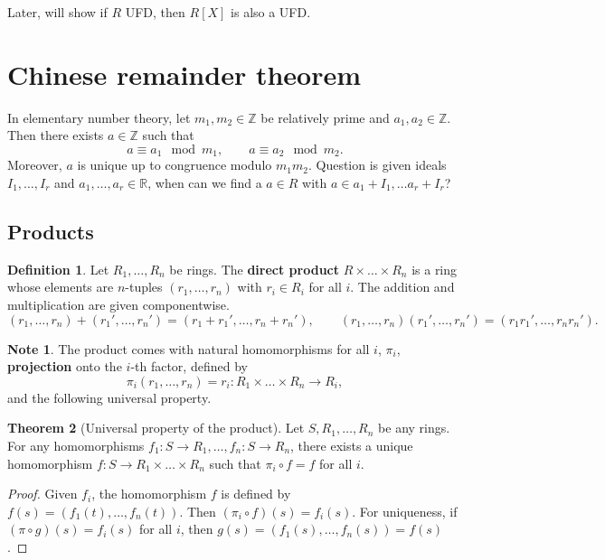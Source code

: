 \documentclass{article}
\newcommand{\Z}{\mathbb{Z}}
\newcommand{\R}{\mathbb{R}}
\newcommand{\rb}[1]{\left( #1 \right)}
\renewcommand{\sb}[1]{\left[ #1 \right]}
\theoremstyle{definition}\newtheorem{definition}{Definition}[section]
\theoremstyle{definition}\newtheorem{remark}[definition]{Remark}
\theoremstyle{definition}\newtheorem*{example}{Example}
\theoremstyle{definition}\newtheorem*{note}{Note}
\newtheorem{theorem}[definition]{Theorem}
\begin{document}
Later, will show if $ R $ UFD, then $ R\sb{X} $ is also a UFD.

\section{Chinese remainder theorem}

In elementary number theory, let $ m_1, m_2 \in \Z $ be relatively prime and $ a_1, a_2 \in \Z $. Then there exists $ a \in \Z $ such that
$$ a \equiv a_1 \mod m_1, \qquad a \equiv a_2 \mod m_2. $$
Moreover, $ a $ is unique up to congruence modulo $ m_1m_2 $. Question is given ideals $ I_1, \dots, I_r $ and $ a_1, \dots, a_r \in \R $, when can we find a $ a \in R $ with $ a \in a_1 + I_1, \dots a_r + I_r $?

\subsection{Products}

\begin{definition}
Let $ R_1, \dots, R_n $ be rings. The \textbf{direct product} $ R \times \dots \times R_n $ is a ring whose elements are $ n $-tuples $ \rb{r_1, \dots, r_n} $ with $ r_i \in R_i $ for all $ i $. The addition and multiplication are given componentwise.
$$ \rb{r_1, \dots, r_n} + \rb{r_1', \dots, r_n'} = \rb{r_1 + r_1', \dots, r_n + r_n'}, \qquad \rb{r_1, \dots, r_n}\rb{r_1', \dots, r_n'} = \rb{r_1r_1', \dots, r_nr_n'}. $$
\end{definition}

\begin{note}
The product comes with natural homomorphisms for all $ i $, $ \pi_i $, \textbf{projection} onto the $ i $-th factor, defined by
$$ \pi_i\rb{r_1, \dots, r_n} = r_i : R_1 \times \dots \times R_n \to R_i, $$
and the following universal property.
\end{note}

\begin{theorem}[Universal property of the product]
Let $ S, R_1, \dots, R_n $ be any rings. For any homomorphisms $ f_1 : S \to R_1, \dots, f_n : S \to R_n $, there exists a unique homomorphism $ f : S \to R_1 \times \dots \times R_n $ such that $ \pi_i \circ f = f $ for all $ i $.
\end{theorem}

\begin{proof}
Given $ f_i $, the homomorphism $ f $ is defined by $ f\rb{s} = \rb{f_1\rb{t}, \dots, f_n\rb{t}} $. Then $ \rb{\pi_i \circ f}\rb{s} = f_i\rb{s} $. For uniqueness, if $ \rb{\pi \circ g}\rb{s} = f_i\rb{s} $ for all $ i $, then $ g\rb{s} = \rb{f_1\rb{s}, \dots, f_n\rb{s}} = f\rb{s} $.
\end{proof}
\end{document}

